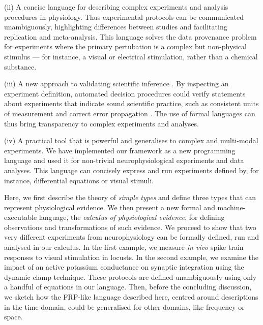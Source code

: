 (ii) A concise language for describing complex experiments and
analysis procedures in physiology. Thus experimental protocols can be
communicated unambiguously, highlighting differences between studies
and facilitating replication and meta-analysis. This language solves
the data provenance problem \citep{Pool2002} for experiments where the
primary pertubation is a complex but non-physical stimulus --- for
instance, a visual or electrical stimulation, rather than a chemical
substance.

(iii) A new approach to validating scientific inference
\citep{Editors2003, Editors2010, DeSchutter2010}. By inspecting an
experiment definition, automated decision procedures could verify
statements about experiments that indicate sound scientific practice,
such as consistent units of measurement \citep{Kennedy1997} and
correct error propagation \citep{Taylor1997}. The use of formal
languages can thus bring transparency to complex experiments and
analyses.

(iv) A practical tool that is powerful and generalises to complex and
multi-modal experiments. We have implemented our framework as a new
programming language and used it for non-trivial neurophysiological
experiments and data analyses. This language can concisely express and
run experiments defined by, for instance, differential equations or
visual stimuli.

Here, we first describe the theory of \emph{simple types}
\citep{Pierce2002} and define three types that can represent
physiological evidence. We then present a new formal and
machine-executable language, the \emph{calculus of physiological
evidence}, for defining observations and transformations of such
evidence. We proceed to show that two very different experiments from
neurophysiology can be formally defined, run and analysed in our
calculus. In the first example, we measure \emph{in vivo} spike train
responses to visual stimulation in locusts. In the second example, we
examine the impact of an active potassium conductance on synaptic
integration using the dynamic clamp technique. These protocols are
defined unambiguously using only a handful of equations in our
language. Then, before the concluding discussion, we sketch how the FRP-like
language described here, centred around descriptions in the time domain,
could be generalised for other domains, like frequency or space.


